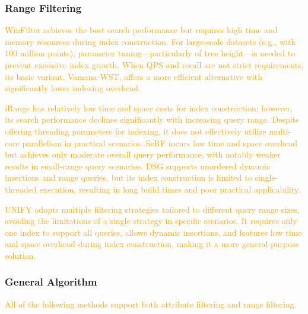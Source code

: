 \documentclass[sigconf, nonacm]{acmart}
\begin{document}
	\subsubsection{\textbf{Range Filtering}}
\textcolor{orange}{
	WinFilter achieves the best search performance but requires high time and memory resources during index construction. For large-scale datasets (e.g., with 100 million points), parameter tuning—particularly of tree height—is needed to prevent excessive index growth. When QPS and recall are not strict requirements, its basic variant, Vamana-WST, offers a more efficient alternative with significantly lower indexing overhead.
		}
	
	\textcolor{orange}{
	iRange has relatively low time and space costs for index construction; however, its search performance declines significantly with increasing query range. Despite offering threading parameters for indexing, it does not effectively utilize multi-core parallelism in practical scenarios.
	SeRF incurs low time and space overhead but achieves only moderate overall query performance, with notably weaker results in small-range query scenarios.
	DSG supports unordered dynamic insertions and range queries, but its index construction is limited to single-threaded execution, resulting in long build times and poor practical applicability.}
	
		\textcolor{orange}{
	UNIFY adopts multiple filtering strategies tailored to different query range sizes, avoiding the limitations of a single strategy in specific scenarios. It requires only one index to support all queries, allows dynamic insertions, and features low time and space overhead during index construction, making it a more general-purpose solution.}

	\subsubsection{\textbf{General Algorithm}}
\textcolor{orange}{All of the following methods support both attribute filtering and range filtering.}
\end{document}
